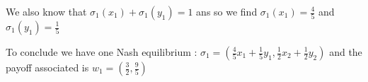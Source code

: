 We also know that $\sigma_1(x_1) + \sigma_1(y_1) = 1$ ans so we find $\sigma_1(x_1)=\frac{4}{5}$ and $\sigma_1(y_1)=\frac{1}{5}$

To conclude we have one Nash equilibrium :
$\sigma_1 = \left( \frac{4}{5}x_1 + \frac{1}{5}y_1, \frac{1}{2}x_2 + \frac{1}{2}y_2\right)$ and the payoff associated is $w_1= \left(\frac{3}{2},\frac{9}{5}\right)$
        
  
  
 
 
 
 
 
 
 
 
 
 
 
 
 
 
